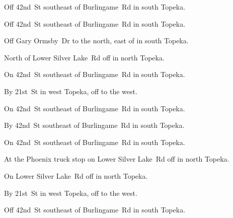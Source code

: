 

\begin{LocationList}

Off 42nd~St southeast of Burlingame~Rd in south Topeka.

Off 42nd~St southeast of Burlingame~Rd in south Topeka.

Off Gary Ormsby~Dr to the north, east of  in south Topeka.

North of Lower Silver Lake~Rd off  in north Topeka.

\Location{\GarageHQ \Garage}
On 42nd~St southeast of Burlingame~Rd in south Topeka.

By 21st~St in west Topeka, off   to the west.

On 42nd~St southeast of Burlingame~Rd in south Topeka.

\Location{\RecruitmentAgency \Recruitment}
By 42nd~St southeast of Burlingame~Rd in south Topeka.

\Location{\TruckService \Service \Rest}
On 42nd~St southeast of Burlingame~Rd in south Topeka.

At the Phoenix truck stop on Lower Silver Lake~Rd off  in north Topeka.

On Lower Silver Lake~Rd off  in north Topeka.

By 21st~St in west Topeka, off   to the west.

Off 42nd~St southeast of Burlingame~Rd in south Topeka.

\end{LocationList}
